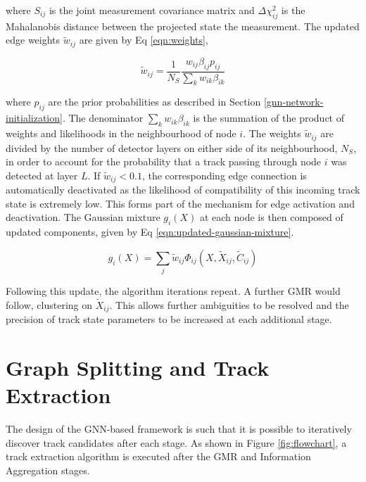 where $S_{ij}$ is the joint measurement covariance matrix and $\Delta \chi^{2}_{ij}$ is the Mahalanobis distance between the projected state the measurement. The updated edge weights $\widetilde{w}_{ij}$ are given by Eq \eqref{eqn:weights}, 

\begin{equation}
\widetilde{w}_{ij} = \frac{1}{N_S} \frac{w_{ij}\beta_{ij} p_{ij}}{\sum_{k}w_{ik}\beta_{ik}}
\label{eqn:weights}
\end{equation}


where $p_{ij}$ are the prior probabilities as described in Section \ref{gnn-network-initialization}. The denominator $\sum_{k}w_{ik}\beta_{ik}$ is the summation of the product of weights and likelihoods in the neighbourhood of node $i$. The weights $\widetilde{w}_{ij}$ are divided by the number of detector layers on either side of its neighbourhood, $N_S$, in order to account for the probability that a track passing through node $i$ was detected at layer $L$. If $\widetilde{w}_{ij} < 0.1$, the corresponding edge connection is automatically deactivated as the likelihood of compatibility of this incoming track state is extremely low. This forms part of the mechanism for edge activation and deactivation. The Gaussian mixture $g_i(X)$ at each node is then composed of updated components, given by Eq \eqref{eqn:updated-gaussian-mixture}.

\begin{equation}
g_i(X) = \sum_{j} \widetilde{w}_{ij}\Phi_{ij}(X, \widetilde{X}_{ij}, \widetilde{C}_{ij})
\label{eqn:updated-gaussian-mixture}
\end{equation}

Following this update, the algorithm iterations repeat. A further GMR would follow, clustering on $\widetilde{X}_{ij}$. This allows further ambiguities to be resolved and the precision of track state parameters to be increased at each additional stage.






\section{Graph Splitting and Track Extraction}
\label{gnn-track-extration}

The design of the GNN-based framework is such that it is possible to iteratively discover track candidates after each stage. As shown in Figure \ref{fig:flowchart}, a track extraction algorithm is executed after the GMR and Information Aggregation stages.

